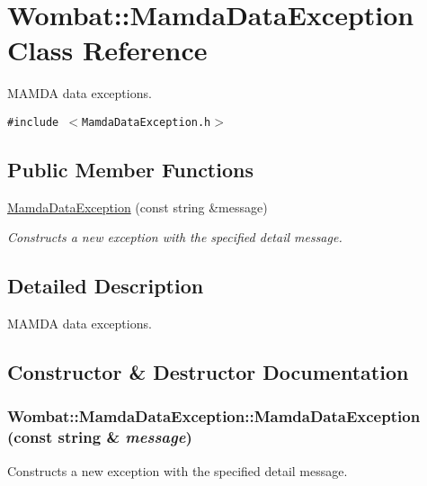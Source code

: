 \hypertarget{classWombat_1_1MamdaDataException}{
\section{Wombat::Mamda\-Data\-Exception Class Reference}
\label{classWombat_1_1MamdaDataException}
}
MAMDA data exceptions.  


{\tt \#include $<$Mamda\-Data\-Exception.h$>$}

\subsection*{Public Member Functions}
\begin{CompactItemize}
\item 
\hyperlink{classWombat_1_1MamdaDataException_a9f0394b4dac3ab2ce245712fd6524f7}{Mamda\-Data\-Exception} (const string \&message)
\begin{CompactList}\small\item\em Constructs a new exception with the specified detail message. \item\end{CompactList}\end{CompactItemize}


\subsection{Detailed Description}
MAMDA data exceptions. 



\subsection{Constructor \& Destructor Documentation}
\hypertarget{classWombat_1_1MamdaDataException_a9f0394b4dac3ab2ce245712fd6524f7}{
\subsubsection[MamdaDataException]{\setlength{\rightskip}{0pt plus 5cm}Wombat::Mamda\-Data\-Exception::Mamda\-Data\-Exception (const string \& {\em message})}}
\label{classWombat_1_1MamdaDataException_a9f0394b4dac3ab2ce245712fd6524f7}


Constructs a new exception with the specified detail message. 

